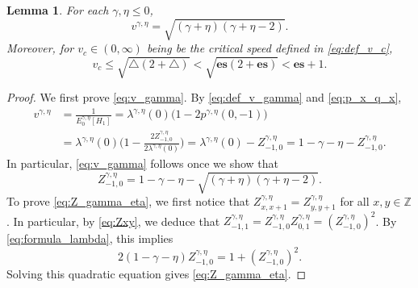 \documentclass[12pt,reqno,oneside]{amsart}
\numberwithin{equation}{section}
\newtheorem{lemma}[theorem]{Lemma}
\theoremstyle{definition}
\theoremstyle{remark}
\newcommand{\Z}{\mathbb{Z}}
\newcommand{\es}{\mathbf{es}}
\begin{document}
\begin{lemma}\label{lemma:velcrit}
   For each $\gamma, \eta \leq 0$,
  \begin{equation}\label{eq:v_gamma}
      v^{\gamma, \eta}=\sqrt{(\gamma+\eta)(\gamma+\eta-2)}.
  \end{equation}
  Moreover, for $v_c \in (0,\infty)$ being be the critical speed defined in
  \eqref{eq:def_v_c},
  \begin{equation} \label{eq:velcrit}
    v_c
    \leq \sqrt{\triangle(2+\triangle)} < \sqrt{\es(2+\es)} < \es +1.
  \end{equation}
\end{lemma}

\begin{proof}
  We first prove \eqref{eq:v_gamma}.
  By \eqref{eq:def_v_gamma} and \eqref{eq:p_x_q_x},
  \begin{equation}
    \label{eq:compute_v_gamma}
    \begin{split}
      v^{\gamma,\eta}&= \frac{1}{E_0^{\gamma,\eta}[H_1]}
      = \lambda^{\gamma,\eta}(0)\big(1-2p^{ \gamma, \eta}(0,-1)\big)
      \\ &=
      \lambda^{\gamma,\eta}(0)
      \Big(1-\frac{2Z_{-1,0}^{\gamma,\eta}}{2\lambda^{\gamma,\eta}(0)}\Big)
      = \lambda^{\gamma,\eta}(0)-Z_{-1,0}^{\gamma,\eta}
      =1-\gamma - \eta-Z_{-1,0}^{\gamma,\eta}.
    \end{split}
  \end{equation}
  In particular, \eqref{eq:v_gamma} follows once we show that
  \begin{equation}\label{eq:Z_gamma_eta}
    Z_{-1,0}^{\gamma,\eta}
    =1- \gamma - \eta-\sqrt{(\gamma+\eta)(\gamma+\eta-2)}.
  \end{equation}
  To prove \eqref{eq:Z_gamma_eta}, we first notice that
  $Z_{x,x+1}^{\gamma,\eta}=Z_{y,y+1}^{\gamma,\eta}$ for all $x,y \in \Z$. In
  particular, by \eqref{eq:Zxy}, we deduce that
  $Z_{-1,1}^{\gamma,\eta}=Z_{-1,0}^{\gamma,\eta}Z_{0,1}^{\gamma,\eta}
  =(Z_{-1,0}^{\gamma,\eta})^2$. By \eqref{eq:formula_lambda}, this implies
  \begin{equation*}
    2(1- \gamma - \eta)Z_{-1,0}^{\gamma,\eta}=1+(Z_{-1,0}^{\gamma,\eta})^2.
  \end{equation*}
  Solving this quadratic equation gives \eqref{eq:Z_gamma_eta}.


\end{proof}
\end{document}
